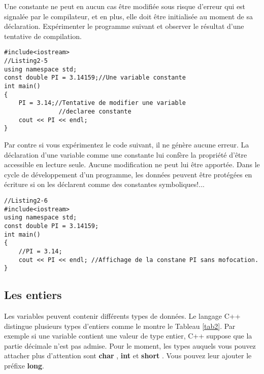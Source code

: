 \documentclass[a4paper, oneside,11pt]{book}
\begin{document}
Une constante  ne peut en aucun cas \^etre modifi\'ee sous risque d'erreur qui est signal\'ee par le compilateur, et en plus, elle doit \^etre initialis\'ee 
au moment de sa d\'eclaration. 
Exp\'erimenter le programme  suivant et observer le r\'esultat d'une
tentative de compilation. 
\begin{lstlisting}
#include<iostream>
//Listing2-5
using namespace std;
const double PI = 3.14159;//Une variable constante
int main()
{
    PI = 3.14;//Tentative de modifier une variable
               //declaree constante
    cout << PI << endl;
}
\end{lstlisting}
Par contre si vous exp\'erimentez le code suivant, il ne g\'en\`ere aucune erreur. La d\'eclaration d'une variable comme une constante lui conf\`ere la propri\'et\'e d'\^etre 
accessible en lecture seule. Aucune modification ne peut lui  \^etre apport\'ee. Dans le cycle de d\'eveloppement d'un programme, les donn\'ees peuvent \^etre prot\'eg\'ees en 
\'ecriture si on les d\'eclarent comme des constantes symboliques!...

\begin{lstlisting}
//Listing2-6
#include<iostream>
using namespace std;
const double PI = 3.14159;
int main()
{
    //PI = 3.14;
    cout << PI << endl; //Affichage de la constane PI sans mofocation.
}
\end{lstlisting}




\subsection{Les entiers}

Les variables peuvent contenir diff\'erents types de donn\'ees. 
Le langage C++ distingue plusieurs types d'entiers comme le montre le Tableau \ref{tab2}. Par exemple si une variable contient une valeur de type entier, C++ suppose que la partie 
d\'ecimale n'est pas admise. Pour le moment, les types auquels vous pouvez attacher plus d'attention sont \textbf{char} , \textbf{int}  et  \textbf{short} . Vous pouvez leur ajouter
le pr\'efixe \textbf{long}.
\end{document}

